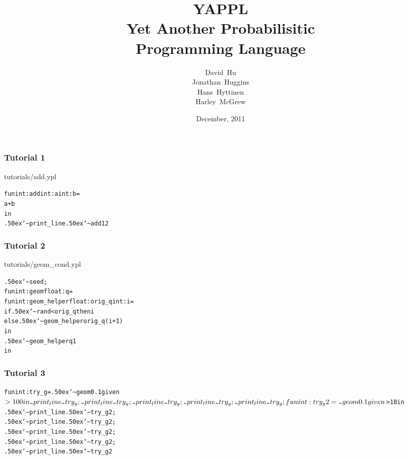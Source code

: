 \documentclass[xcolor=dvipsnames]{beamer}
\title[YAPPL] 
{
  YAPPL\\
  Yet Another Probabilisitic\\ Programming Language \\
}
\author[Hu, Huggins, Hyttinen, \& McGrew]
{
  David~Hu\\
  Jonathan~Huggins\\
  Hans~Hyttinen\\
  Harley~McGrew\\
}
\institute[Columbia University]
{
  Columbia University
}
\date[December, 2011]
{December, 2011}
\newcommand\midtilde{{\lower.50ex\hbox{\texttt{\char`\~}}}}
\begin{document}
\begin{frame}
  \titlepage
\end{frame}





\begin{frame}[fragile]
\frametitle{Tutorial 1}
tutorials/add.ypl
\begin{alltt}
fun int:add int:a int:b = 
   a + b
in 
  {\midtilde}print_line {\midtilde}add 1 2
\end{alltt}
\end{frame}

\begin{frame}[fragile]
\frametitle{Tutorial 2}
tutorials/geom\_cond.ypl
\begin{alltt}
 {\midtilde}seed;
 fun int:geom float:q =
   fun int:geom_helper float:orig_q int:i =
     if {\midtilde}rand < orig_q then i
     else {\midtilde}geom_helper orig_q (i+1)
   in 
     {\midtilde}geom_helper q 1
 in
\end{alltt}
\end{frame}

\begin{frame}[fragile]
\frametitle{Tutorial 3}
\begin{alltt}
 fun int:try_g = {\midtilde}geom 0.1 given $ > 100 in
 {\midtilde}print_line {\midtilde}try_g;
 {\midtilde}print_line {\midtilde}try_g;
 {\midtilde}print_line {\midtilde}try_g;
 {\midtilde}print_line {\midtilde}try_g;
 {\midtilde}print_line {\midtilde}try_g;
 
 fun int:try_g2 = {\midtilde}geom 0.1 given $ > 10 in
 {\midtilde}print_line {\midtilde}try_g2;
 {\midtilde}print_line {\midtilde}try_g2;
 {\midtilde}print_line {\midtilde}try_g2;
 {\midtilde}print_line {\midtilde}try_g2;
 {\midtilde}print_line {\midtilde}try_g2
\end{alltt}
\end{frame}
\end{document}
